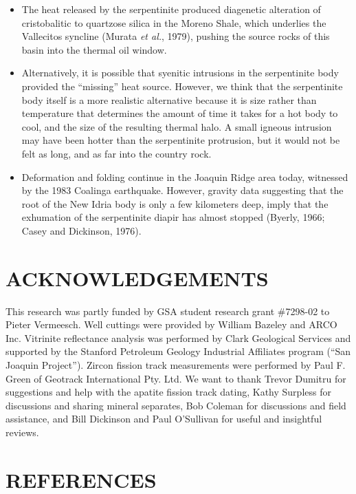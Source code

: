 \documentclass[11pt,twoside]{article}
\begin{document}
\begin{itemize}
\item  The  heat  released  by the  serpentinite  produced  diagenetic
 alteration of cristobalitic to  quartzose silica in the Moreno Shale,
 which underlies the Vallecitos  syncline (Murata {\it et al.}, 1979),
 pushing the source rocks of this basin into the thermal oil window.
\item Alternatively,  it is possible  that syenitic intrusions  in the
 serpentinite body provided the  ``missing'' heat source.  However, we
 think  that  the  serpentinite   body  itself  is  a  more  realistic
 alternative  because   it  is  size  rather   than  temperature  that
 determines the  amount of time it takes  for a hot body  to cool, and
 the size of the resulting thermal halo. A small igneous intrusion may
 have been hotter  than the serpentinite protrusion, but  it would not
 be felt as long, and as far into the country rock.
\item  Deformation and  folding  continue in  the  Joaquin Ridge  area
 today, witnessed  by the 1983 Coalinga  earthquake.  However, gravity
 data suggesting  that the root  of the New  Idria body is only  a few
 kilometers deep, imply that the exhumation of the serpentinite diapir
 has almost stopped (Byerly, 1966; Casey and Dickinson, 1976).
\end{itemize}

\section*{\uppercase{Acknowledgements}}

This  research  was  partly  funded  by  GSA  student  research  grant
\#7298-02 to Pieter Vermeesch.  Well cuttings were provided by William
Bazeley and ARCO Inc.  Vitrinite reflectance analysis was performed by
Clark  Geological Services  and  supported by  the Stanford  Petroleum
Geology  Industrial  Affiliates  program  (``San  Joaquin  Project'').
Zircon fission track  measurements were performed by Paul  F. Green of
Geotrack International Pty.  Ltd. We  want to thank Trevor Dumitru for
suggestions  and help  with the  apatite fission  track  dating, Kathy
Surpless for  discussions and  sharing mineral separates,  Bob Coleman
for  discussions and  field assistance,  and Bill  Dickinson  and Paul
O'Sullivan for useful and insightful reviews.

\section*{\uppercase{References}}
\end{document}
